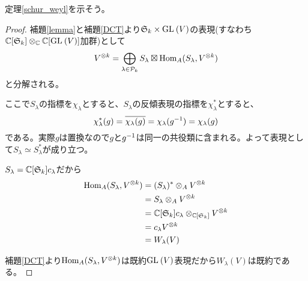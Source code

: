 \documentclass{ltjsreport}
\begin{document}
定理\ref{schur_weyl}を示そう。
\begin{proof}
  補題\ref{lemma}と補題\ref{DCT}より$\mathfrak{S}_k\times\text{GL}\:(V)$の表現(すなわち$\mathbb{C}[\mathfrak{S}_k]\otimes_{\mathbb{C}}\mathbb{C}[\text{GL}\:(V)]$加群)として
  \[
  V^{\otimes k}=\bigoplus_{\lambda\in\mathcal{P}_k}S_\lambda\boxtimes \text{Hom}_A(S_\lambda,V^{\otimes k})  
  \]
  と分解される。
  
  ここで$S_\lambda$の指標を$\chi_\lambda$とすると、$S_\lambda$の反傾表現の指標を$\chi^*_\lambda$とすると、
  \[
  \chi^*_\lambda(g)=\overline{\chi_\lambda(g)}=\chi_\lambda(g^{-1})=\chi_\lambda(g)  
  \]
  である。実際$g$は置換なので$g$と$g^{-1}$は同一の共役類に含まれる。よって表現として$S_\lambda\simeq S_\lambda^*$が成り立つ。

  $S_\lambda=\mathbb{C}[\mathfrak{S}_k]c_\lambda$だから
  \begin{align*}
    \text{Hom}_A(S_\lambda,V^{\otimes k})
    &=(S_\lambda)^*\otimes_AV^{\otimes k}\\
    &=S_\lambda\otimes_AV^{\otimes k}\\
    &=\mathbb{C}[\mathfrak{S}_k]c_\lambda\otimes_{\mathbb{C}[\mathfrak{S}_k]}V^{\otimes k}\\
    &=c_\lambda V^{\otimes k}\\
    &=W_\lambda(V)
  \end{align*}

  補題\ref{DCT}より$\text{Hom}_A(S_\lambda,V^{\otimes k})$は既約$\text{GL}\:(V)$表現だから$W_\lambda(V)$は既約である。
\end{proof}
\end{document}
